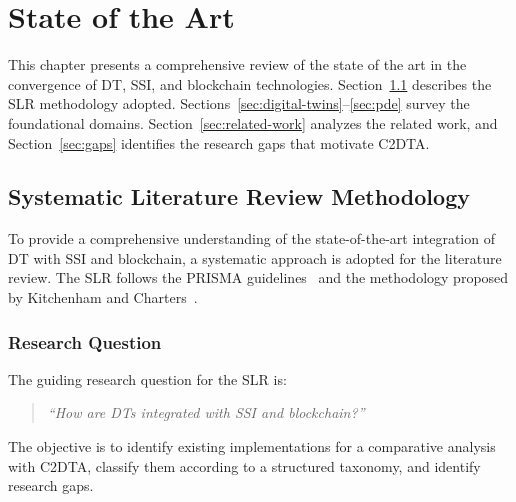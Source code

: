 \chapter{State of the Art}
\label{ch:state-of-art}

\noindent This chapter presents a comprehensive review of the state of the art in the convergence of \ac{DT}, \ac{SSI}, and blockchain technologies.
Section~\ref{sec:slr-methodology} describes the \ac{SLR} methodology adopted.
Sections~\ref{sec:digital-twins}--\ref{sec:pde} survey the foundational domains.
Section~\ref{sec:related-work} analyzes the related work, and Section~\ref{sec:gaps} identifies the research gaps that motivate \ac{C2DTA}.

\section{Systematic Literature Review Methodology}
\label{sec:slr-methodology}

\noindent To provide a comprehensive understanding of the state-of-the-art integration of \ac{DT} with \ac{SSI} and blockchain, a systematic approach is adopted for the literature review.
The \ac{SLR} follows the PRISMA guidelines~\cite{moher:liberati:tetzlaff:etal:2010} and the methodology proposed by Kitchenham and Charters~\cite{kitchenham:charters:2007}.

\subsection{Research Question}
\label{subsec:slr-rq}

The guiding research question for the \ac{SLR} is:

\begin{quote}
    \emph{``How are \acp{DT} integrated with \ac{SSI} and blockchain?''}
\end{quote}

The objective is to identify existing implementations for a comparative analysis with \ac{C2DTA}, classify them according to a structured taxonomy, and identify research gaps.

